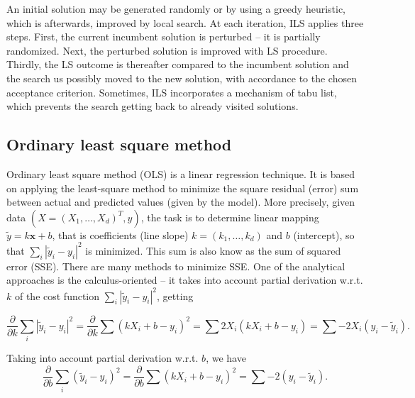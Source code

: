 \documentclass[a4paper,12pt]{elsarticle}
\begin{document}
An initial solution may be generated randomly or by using a greedy heuristic, which is afterwards, improved by local search. At each iteration, ILS applies three steps. First, the current incumbent solution is perturbed -- it is partially randomized. Next, the perturbed solution is improved with LS procedure. Thirdly, the LS outcome is thereafter compared to the incumbent solution and the search us possibly moved to the new solution, with accordance to the chosen acceptance criterion. Sometimes, ILS incorporates a mechanism of tabu list, which prevents the search getting back to already visited solutions. 
   
 \subsection{Ordinary least square method}\label{sec:ols}
   Ordinary least square method (OLS) is a linear regression technique. It is based on applying the least-square method to minimize the square residual (error) sum  between actual and predicted values (given by the model). More precisely, given data $({X}=(X_1, \ldots, X_d)^T, y)$, the task is to determine linear mapping $\tilde{y} = k \textbf{x} + b$, that is coefficients (line slope) $k = (k_1, \ldots, k_d)$ and $b$ (intercept), so that $ \sum_{i} |\tilde{y}_i - y_i|^2 $ is minimized. This sum is also know as the sum of squared error (SSE). There are many methods to minimize SSE. One of the analytical approaches is the calculus-oriented -- it takes into account   partial derivation w.r.t. $k$ of the cost function $ \sum_{i} |\tilde{y}_i - y_i|^2 $, getting 
   
   $$  \frac{\partial}{\partial k} \sum_{i} |\tilde{y}_i - y_i|^2 = \frac{\partial}{\partial k} \sum ( kX_i+b  - y_i)^2 =  \sum 2X_i(kX_i + b - y_i)  =  \sum -2X_i (y_i - \tilde{y}_i) . $$
   
   Taking into account   partial derivation w.r.t.  $b$, we have 
    $$  \frac{\partial}{\partial b} \sum_{i} (\tilde{y}_i - y_i)^2  = \frac{\partial}{\partial b} \sum ( kX_i+b  - y_i)^2 = \sum -2  (y_i - \tilde{y}_i). $$
    
\end{document}
